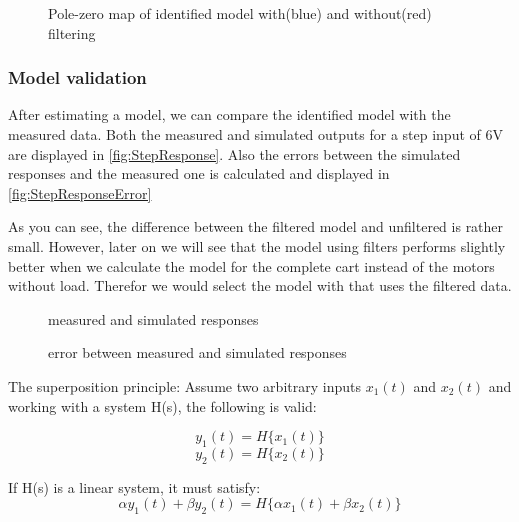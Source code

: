 \documentclass[a4paper]{article}
\newcommand{\newpar}{\vspace{.3cm}\noindent}
\begin{document}
\begin{figure}[H]
    \caption{Pole-zero map of identified model with(blue) and without(red) filtering}
    \label{fig:pzmap}
\end{figure}

\subsubsection{Model validation}
After estimating a model, we can compare the identified model with the measured data. Both the measured and simulated outputs for a step input of 6V are displayed in \autoref{fig:StepResponse}. Also the errors between the simulated responses and the measured one is calculated and displayed in \autoref{fig:StepResponseError}

\newpar
As you can see, the difference between the filtered model and unfiltered is rather small. However, later on we will see that the model using filters performs slightly better when we calculate the model for the complete cart instead of the motors without load. Therefor we would select the model with that uses the filtered data.

\begin{figure}[H]
    \caption{measured and simulated responses}
    \label{fig:StepResponse}
\end{figure}

\begin{figure}[H]
    \caption{error between measured and simulated responses}
    \label{fig:StepResponseError}
\end{figure}

\newpar
The superposition principle:
Assume two arbitrary inputs $x_1(t)$ and $x_2(t)$ and working with a system H(s), the following is valid:

\begin{equation}
    y_1(t) = H\{x_1(t)\}
\end{equation}
\begin{equation}
    y_2(t) = H\{x_2(t)\}
\end{equation}

\newpar
If H(s) is a linear system, it must satisfy:
\begin{equation}
    \alpha y_1(t) + \beta y_2(t) = H\{\alpha x_1(t)+\beta x_2(t)\}
\end{equation}
\end{document}
